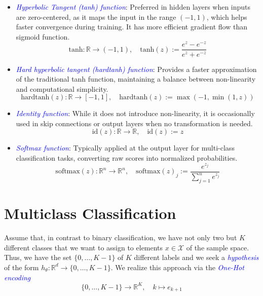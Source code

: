 \begin{example}
\begin{itemize}
    \item \textcolor{blue}{\emph{Hyperbolic Tangent (tanh) function}}: Preferred in hidden layers when inputs are zero-centered, as it maps the input in the range $(-1, 1)$, which helps faster convergence during training. It has more efficient gradient flow than sigmoid function.
    \begin{equation}
        \text{tanh}: \mathbb{R} \to (-1,1), \quad \text{tanh}(z) := \frac{e^z-e^{-z}}{e^z+e^{-z}}
        \label{eqn:35}
    \end{equation}
    
    \item \textcolor{blue}{\emph{Hard hyperbolic tangent (hardtanh) function}}: Provides a faster approximation of the traditional tanh function, maintaining a balance between non-linearity and computational simplicity.
    \begin{equation}
        \text{hardtanh}(z): \mathbb{R} \to [-1,1], \quad \text{hardtanh}(z) := \max(-1, \min(1,z))
        \label{eqn:36}
    \end{equation}
    
    \item \textcolor{blue}{\emph{Identity function}}: While it does not introduce non-linearity, it is occasionally used in skip connections or output layers when no transformation is needed.
    \begin{equation}
        \text{id}(z): \mathbb{R} \to \mathbb{R}, \quad \text{id}(z) := z
        \label{eqn:37}
    \end{equation}
    
    \item \textcolor{blue}{\emph{Softmax function}}: Typically applied at the output layer for multi-class classification tasks, converting raw scores into normalized probabilities.
    \begin{equation}
        \text{softmax}(z) : \mathbb{R}^n \to \mathbb{R}^n, \quad \text{softmax}(z)_j := \frac{e^{z_j}}{\sum_{j=1}^n e^{z_j}}
        \label{eqn:38}
    \end{equation}
\end{itemize}

\end{example}

\section{Multiclass Classification}
Assume that, in contrast to binary classification, we have not only two but $K$ different classes that we want to assign to elements $x \in \mathcal{X}$ of the sample space. Thus, we have the set $\{0, \ldots, K-1\}$ of $K$ different labels and we seek a \textcolor{blue}{\emph{hypothesis}} of the form $h_{\theta}: \mathbb{R}^d \rightarrow \{0, \ldots, K-1\}$. We realize this approach via the \textcolor{blue}{\emph{One-Hot encoding}}
\begin{equation}
    \{0, \ldots, K-1\} \rightarrow \mathbb{R}^K, \quad k \mapsto e_{k+1}
    \label{eqn:39}
\end{equation}

